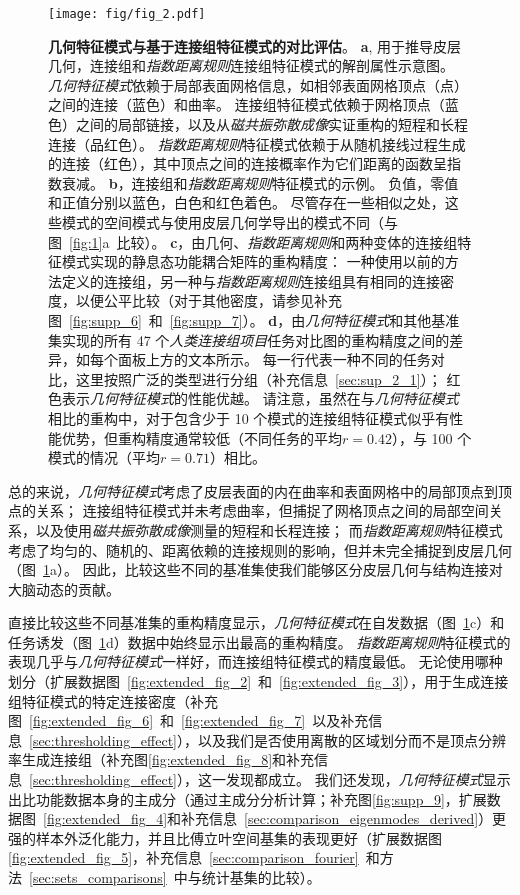 \documentclass[lang=cn,a4paper,newtx,citestyle=gb7714-2015, bibstyle=gb7714-2015]{elegantpaper}
\begin{document}
\begin{figure}[!htb]
	\centering
	\texttt{[image: fig/fig\_2.pdf]}
	\caption{\textbf{几何特征模式与基于连接组特征模式的对比评估}。
		\textbf{a}, 用于推导皮层几何，连接组和\textit{指数距离规则}连接组特征模式的解剖属性示意图。
		\textit{几何特征模式}依赖于局部表面网格信息，如相邻表面网格顶点（点）之间的连接（蓝色）和曲率。
		连接组特征模式依赖于网格顶点（蓝色）之间的局部链接，以及从\textit{磁共振弥散成像}实证重构的短程和长程连接（品红色）。
		\textit{指数距离规则}特征模式依赖于从随机接线过程生成的连接（红色），其中顶点之间的连接概率作为它们距离的函数呈指数衰减。
		\textbf{b}，连接组和\textit{指数距离规则}特征模式的示例。
		负值，零值和正值分别以蓝色，白色和红色着色。
		尽管存在一些相似之处，这些模式的空间模式与使用皮层几何学导出的模式不同（与图~\ref{fig:1}a~比较）。
		\textbf{c}，由几何、\textit{指数距离规则}和两种变体的连接组特征模式实现的静息态功能耦合矩阵的重构精度：
		一种使用以前的方法\cite{naze2021robustness}定义的连接组，另一种与\textit{指数距离规则}连接组具有相同的连接密度，以便公平比较（对于其他密度，请参见补充图~\ref{fig:supp_6}~和~\ref{fig:supp_7}）。
		\textbf{d}，由\textit{几何特征模式}和其他基准集实现的所有 47 个\textit{人类连接组项目}任务对比图的重构精度之间的差异，如每个面板上方的文本所示。
		每一行代表一种不同的任务对比，这里按照广泛的类型进行分组（补充信息~\ref{sec:sup_2_1}）；
		红色表示\textit{几何特征模式}的性能优越。
		请注意，虽然在与\textit{几何特征模式}相比的重构中，对于包含少于 10 个模式的连接组特征模式似乎有性能优势，但重构精度通常较低（不同任务的平均$ r = 0.42 $），与 100 个模式的情况（平均$ r = 0.71 $）相比。
	} \label{fig:2}
\end{figure}


总的来说，\textit{几何特征模式}考虑了皮层表面的内在曲率和表面网格中的局部顶点到顶点的关系；
连接组特征模式并未考虑曲率，但捕捉了网格顶点之间的局部空间关系，以及使用\textit{磁共振弥散成像}测量的短程和长程连接；
而\textit{指数距离规则}特征模式考虑了均匀的、随机的、距离依赖的连接规则的影响，但并未完全捕捉到皮层几何（图~\ref{fig:2}a）。
因此，比较这些不同的基准集使我们能够区分皮层几何与结构连接对大脑动态的贡献。


直接比较这些不同基准集的重构精度显示，\textit{几何特征模式}在自发数据（图~\ref{fig:2}c）和任务诱发（图~\ref{fig:2}d）数据中始终显示出最高的重构精度。
\textit{指数距离规则}特征模式的表现几乎与\textit{几何特征模式}一样好，而连接组特征模式的精度最低。
无论使用哪种划分（扩展数据图~\ref{fig:extended_fig_2}~和~\ref{fig:extended_fig_3}），用于生成连接组特征模式的特定连接密度（补充图~\ref{fig:extended_fig_6}~和~\ref{fig:extended_fig_7}~以及补充信息~\ref{sec:thresholding_effect}），以及我们是否使用离散的区域划分而不是顶点分辨率生成连接组（补充图\ref{fig:extended_fig_8}和补充信息~\ref{sec:thresholding_effect}），这一发现都成立。
我们还发现，\textit{几何特征模式}显示出比功能数据本身的主成分（通过主成分分析计算；补充图\ref{fig:supp_9}，扩展数据图~\ref{fig:extended_fig_4}和补充信息~\ref{sec:comparison_eigenmodes_derived}）更强的样本外泛化能力，并且比傅立叶空间基集的表现更好（扩展数据图\ref{fig:extended_fig_5}，补充信息~\ref{sec:comparison_fourier}~和方法~\ref{sec:sets_comparisons}~中与统计基集的比较）。
\end{document}
